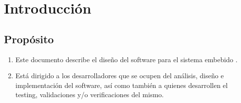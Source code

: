 \documentclass[11pt,a4paper]{article}
\begin{document}
\section{Introducción}
\subsection{Propósito}
\begin{enumerate}
  \item Este documento describe el diseño del software para el sistema embebido \textit{\ttitle}. 
  \item Está dirigido a los desarrolladores que se ocupen del análisis, diseño e implementación del software, así como también a quienes desarrollen el testing, validaciones y/o verificaciones del mismo.
\end{enumerate}
\end{document}
